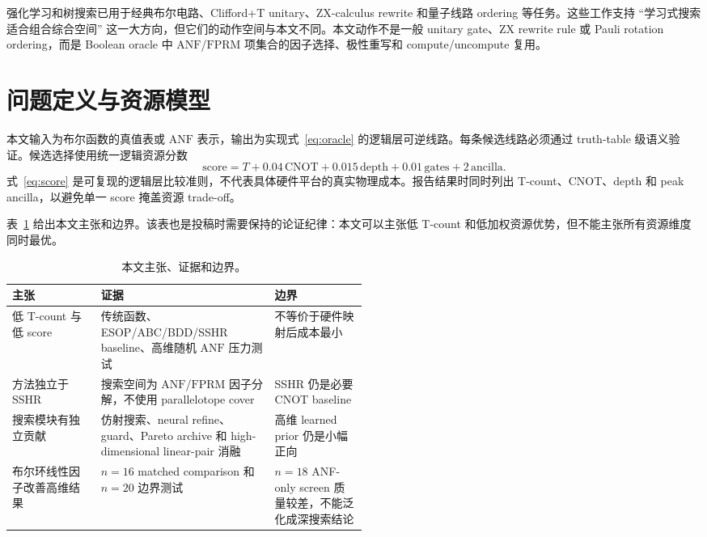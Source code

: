 \documentclass[UTF8,fontset=macnew,11pt]{ctexart}
\newcommand{\score}{\ensuremath{\mathrm{score}}}
\newcommand{\anf}{\ensuremath{\mathrm{ANF}}}
\newcommand{\fprm}{\ensuremath{\mathrm{FPRM}}}
\begin{document}
强化学习和树搜索已用于经典布尔电路、Clifford+T unitary、ZX-calculus rewrite 和量子线路 ordering 等任务\cite{tsaras2024shortcircuit,rietsch2024unitary,riu2025rlzx,machiya2026monteq}。这些工作支持 ``学习式搜索适合组合综合空间'' 这一大方向，但它们的动作空间与本文不同。本文动作不是一般 unitary gate、ZX rewrite rule 或 Pauli rotation ordering，而是 Boolean oracle 中 \anf{}/\fprm{} 项集合的因子选择、极性重写和 compute/uncompute 复用。

\section{问题定义与资源模型}

本文输入为布尔函数的真值表或 \anf{} 表示，输出为实现式~\eqref{eq:oracle} 的逻辑层可逆线路。每条候选线路必须通过 truth-table 级语义验证。候选选择使用统一逻辑资源分数
\begin{equation}
  \score = T + 0.04\,\mathrm{CNOT} + 0.015\,\mathrm{depth}
         + 0.01\,\mathrm{gates} + 2\,\mathrm{ancilla}.
  \label{eq:score}
\end{equation}
式~\eqref{eq:score} 是可复现的逻辑层比较准则，不代表具体硬件平台的真实物理成本。报告结果时同时列出 T-count、CNOT、depth 和 peak ancilla，以避免单一 score 掩盖资源 trade-off。

表~\ref{tab:claim_boundary} 给出本文主张和边界。该表也是投稿时需要保持的论证纪律：本文可以主张低 T-count 和低加权资源优势，但不能主张所有资源维度同时最优。

\begin{table}[t]
\centering
\small
\caption{本文主张、证据和边界。}
\label{tab:claim_boundary}
\begin{tabularx}{\linewidth}{>{\raggedright\arraybackslash}p{0.25\linewidth}
  >{\raggedright\arraybackslash}X
  >{\raggedright\arraybackslash}p{0.26\linewidth}}
\toprule
主张 & 证据 & 边界 \\
\midrule
低 T-count 与低 score & 传统函数、ESOP/ABC/BDD/SSHR baseline、高维随机 \anf{} 压力测试 & 不等价于硬件映射后成本最小 \\
方法独立于 SSHR & 搜索空间为 \anf{}/\fprm{} 因子分解，不使用 parallelotope cover & SSHR 仍是必要 CNOT baseline \\
搜索模块有独立贡献 & 仿射搜索、neural refine、guard、Pareto archive 和 high-dimensional linear-pair 消融 & 高维 learned prior 仍是小幅正向 \\
布尔环线性因子改善高维结果 & $n=16$ matched comparison 和 $n=20$ 边界测试 & $n=18$ ANF-only screen 质量较差，不能泛化成深搜索结论 \\
\bottomrule
\end{tabularx}
\end{table}
\end{document}
